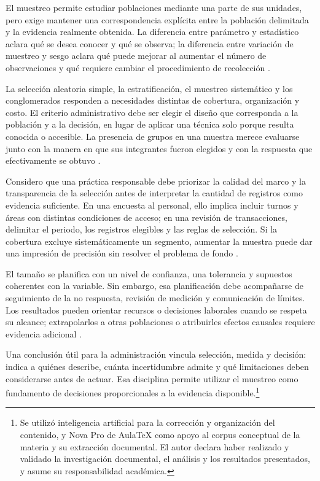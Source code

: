El muestreo permite estudiar poblaciones mediante una parte de sus unidades, pero exige mantener una correspondencia explícita entre la población delimitada y la evidencia realmente obtenida. La diferencia entre parámetro y estadístico aclara qué se desea conocer y qué se observa; la diferencia entre variación de muestreo y sesgo aclara qué puede mejorar al aumentar el número de observaciones y qué requiere cambiar el procedimiento de recolección \citep{wackerly2010,bradley2021}.

La selección aleatoria simple, la estratificación, el muestreo sistemático y los conglomerados responden a necesidades distintas de cobertura, organización y costo. El criterio administrativo debe ser elegir el diseño que corresponda a la población y a la decisión, en lugar de aplicar una técnica solo porque resulta conocida o accesible. La presencia de grupos en una muestra merece evaluarse junto con la manera en que sus integrantes fueron elegidos y con la respuesta que efectivamente se obtuvo \citep{holmesBusiness2023}.

Considero que una práctica responsable debe priorizar la calidad del marco y la transparencia de la selección antes de interpretar la cantidad de registros como evidencia suficiente. En una encuesta al personal, ello implica incluir turnos y áreas con distintas condiciones de acceso; en una revisión de transacciones, delimitar el periodo, los registros elegibles y las reglas de selección. Si la cobertura excluye sistemáticamente un segmento, aumentar la muestra puede dar una impresión de precisión sin resolver el problema de fondo \citep{bradley2021}.

El tamaño se planifica con un nivel de confianza, una tolerancia y supuestos coherentes con la variable. Sin embargo, esa planificación debe acompañarse de seguimiento de la no respuesta, revisión de medición y comunicación de límites. Los resultados pueden orientar recursos o decisiones laborales cuando se respeta su alcance; extrapolarlos a otras poblaciones o atribuirles efectos causales requiere evidencia adicional \citep{bloom2024}.

Una conclusión útil para la administración vincula selección, medida y decisión: indica a quiénes describe, cuánta incertidumbre admite y qué limitaciones deben considerarse antes de actuar. Esa disciplina permite utilizar el muestreo como fundamento de decisiones proporcionales a la evidencia disponible.\footnote{Se utilizó inteligencia artificial para la corrección y organización del contenido, y Nova Pro de AulaTeX como apoyo al corpus conceptual de la materia y su extracción documental. El autor declara haber realizado y validado la investigación documental, el análisis y los resultados presentados, y asume su responsabilidad académica.}
